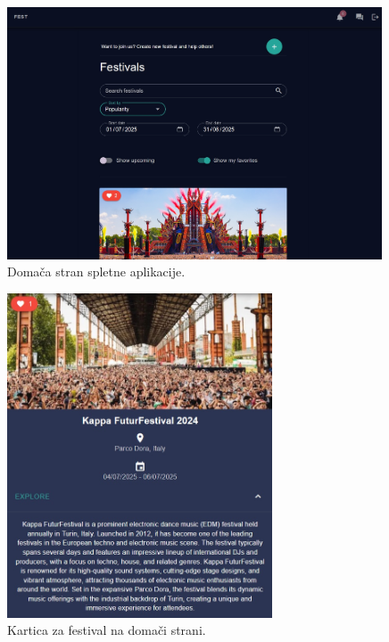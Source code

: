 \documentclass[a4paper,12pt,openright]{book}
\begin{document}
\begin{figure}[htb] %
    \begin{center}
        \includegraphics[width=0.99\textwidth]{img/homepage}
    \end{center}
    \caption{Domača stran spletne aplikacije.}
    \label{homepage}
\end{figure}

\begin{figure}[htb] %
    \begin{center}
        \includegraphics[width=0.7\textwidth]{img/homepagecard}
    \end{center}
    \caption{Kartica za festival na domači strani.}
    \label{homepage}
\end{figure}
\end{document}
